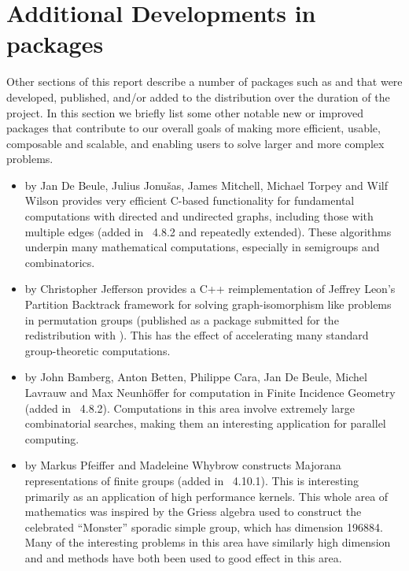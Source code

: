 \section{Additional Developments in \GAP packages} \label{sec:packages}

Other sections of this report describe
a number of \GAP packages such as  and 
that were developed, published,
and/or added to the \GAP distribution over the duration of the project.  In this section
we briefly list some other notable new or improved packages that
contribute to our overall goals of making \GAP more efficient, usable,
composable and scalable, and enabling users to solve larger and more
complex problems.

\begin{itemize}

\item
{} by Jan De Beule, Julius Jonu\v{s}as, James Mitchell,
Michael Torpey and Wilf Wilson \cite{Digraphs} provides very efficient C-based
functionality for fundamental computations with directed and
undirected graphs, including those with multiple edges (added in
\GAP~4.8.2 and repeatedly extended).  These algorithms underpin many
mathematical computations, especially in semigroups and combinatorics.

\item
{} by Christopher Jefferson \cite{ferret} provides a C++
reimplementation of Jeffrey Leon's Partition Backtrack framework for
solving graph-isomorphism like problems in permutation groups
(published as a package submitted for the redistribution with
\GAP). This has the effect of accelerating many standard
group-theoretic computations.

\item
{} by John Bamberg, Anton Betten, Philippe Cara, Jan De
Beule, Michel Lavrauw and Max Neunh\"offer \cite{fining} for computation in Finite
Incidence Geometry (added in \GAP~4.8.2). Computations in this area
involve extremely large combinatorial searches, making them an
interesting application for parallel computing.

\item
{} by Markus Pfeiffer and Madeleine Whybrow \cite{MajoranaAlgebras}
constructs Majorana representations of finite groups (added in
\GAP~4.10.1). This is interesting primarily as an application of high
performance kernels. This whole area of mathematics was inspired by
the Griess algebra used to construct the celebrated ``Monster''
sporadic simple group, which has dimension 196884. Many of the
interesting problems in this area have similarly high dimension and
\HPCGAP and  methods have both been used to good effect in
this area.
%
%


\end{itemize}
